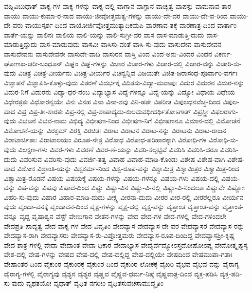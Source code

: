 ವಹ್ನಿವಿಬುಧಾತ್
ವಾಕ್ಯ-ಗಳ
ವಾಕ್ಯ-ಗಳನ್ನು
ವಾಕ್ಯ-ದಲ್ಲಿ
ವಾಗ್ತಾನ
ವಾಗ್ದಾನ
ವಾಚ್ಯತ್ವ
ವಾಪಸ್ಸು
ವಾಮನಾವ-ತಾರ
ವಾಯು
ವಾಯು-ಕುಮಾ-ರ-ನಾದ
ವಾಯು-ಜೀವೋತ್ತಮತ್ವ-ಗಳನ್ನು
ವಾಯು-ದೇ-ವರ
ವಾಯು-ದೇ-ವ-ರಿಂದ
ವಾಯು-ದೇ-ವರು
ವಾಯುಸ್ಪರ್ಶ-ದಿಂದ
ವಾಯೋರ್ಜಿವೋತ್ತಮುತ್ಯಾದಿಕಮಪಿ
ವಾರಣಾವ-ತಕ್ಕೆ
ವಾರಣಾತ್ರ-ದಿಂದ
ವಾರ್ತಾಂ
ವಾರ್ತೆ-ಯನ್ನು
ವಾಲಿನಃ
ವಾಲಿಯ
ವಾಲಿ-ಯನ್ನು
ವಾಲಿ-ಸುಗ್ರೀ-ವರ
ವಾಸ
ವಾಸ-ಮಾಡುತ್ತಿ-ದುದು
ವಾಸ-ಮಾಡುತ್ತಿದ್ದುದು
ವಾಸ-ಮಾಡುವುದು
ವಾಸವೀ
ವಾಸಿಸು-ವಂತೆ
ವಾಸಿ-ಸು-ವುದು
ವಾಸುದೇವ
ವಾಸುದೇವನ
ವಾಸುದೇವನು
ವಾಸುದೇವನೇ
ವಾಸುದೇ-ವಾದಿ
ವಾಸುರನ
ವಾಸ್ತಿ
ವಿಂದ
ವಿಂದ-ಅನು-ವಿಂದರ
ವಿಂದನ
ವಿಕರ್ಣ-ಘೋಣಖ-ಚರೀ-ಬಂಧೂನ್
ವಿಘ್ನಂ
ವಿಘ್ನ-ಗಳನ್ನು
ವಿಚಾರ
ವಿಚಾರ-ಗಳು
ವಿಚಾರ-ದಲ್ಲಿ
ವಿಚಾರ-ವನ್ನು
ವಿಚಾರಿ-ಸು-ವುದು
ವಿಚಿತ್ರ
ವಿಚಿತ್ರ-ವೀರ್ಯನು
ವಿಚಿತ್ರ-ವೀರ್ಯರ
ವಿಚಿನ್ವನ್ನಿವ
ವಿಜಯತೇ
ವಿಜಿತ-ಜರಾಸಂಧ-ಪೂರ್ವಾರಿ-ವರ್ಗಃ
ವಿಜ್ಞಾಪನೆ
ವಿಜ್ಞಾಪಿಸಿ-ಕೊಳ್ಳು-ವುದು
ವಿತರಣೆ
ವಿದರ್ಭಕ್ಕೆ
ವಿದಿತಸು-ವಿದ್ಯಾ-ಮವಾಪುಃ
ವಿದುರ
ವಿದುರನ
ವಿದುರ-ನನ್ನು
ವಿದುರ-ನಿಗೆ
ವಿದುರನು
ವಿದ್ಯಾ-ಧರ-ನೆಂಬ
ವಿದ್ಯಾಭ್ಯಾಸ
ವಿದ್ಯೆ-ಗಳನ್ನೂ
ವಿದ್ಯೆ-ಯನ್ನು
ವಿದ್ಯೋ
ವಿಧಾಯ
ವಿಧೇಯ
ವಿಧೇರತ್ರತಃ
ವಿಧೋರನ್ವಯೇ
ವಿನಃ
ವಿನಹ
ವಿನಾ
ವಿನಾ-ಶವು
ವಿನಿ-ಹತೇ
ವಿಪರೀತ
ವಿಪುಲಧನವೆಚ್ಚ-ದಿಂದ
ವಿಪುಲ-ವಾದ
ವಿಪ್ರ
ವಿಪ್ರ-ತೀ-ಸಾರತಃ
ವಿಪ್ರ-ನಲ್ಲಿ
ವಿಪ್ರ-ಶಾಪಾದ್ಯದು-ಕುಲಮವಧೀದರ್ಥಿತೋಽಗಾತ್
ವಿಪ್ರಸ್ತ್ರೀ
ವಿಫಲರಾಗು-ವುದು
ವಿಭಜನೆ
ವಿಭವ-ನಾಮ
ವಿಭಿದ್ಯ
ವಿಭೀಷಣ-ನಿಂದ
ವಿಭೀಷಣ-ನಿಗೆ
ವಿಭೀಷಣನೂ
ವಿಮಾನ-ದಲ್ಲಿ
ವಿಮೋಚನೆ
ವಿಮೋಚನೆ-ಯನ್ನು
ವಿರಕ್ತಮ್
ವಿರಕ್ತಿ
ವಿರಚಿತಃ
ವಿರಾಟ
ವಿರಾಟನ
ವಿರಾಟ-ನನ್ನು
ವಿರಾಟನು
ವಿರಾಟ-ರಾಜನ
ವಿರಾಟಾರ್ಚಿತಾಃ
ವಿರಾಟಾಲಯಂ
ವಿರೂಪ-ನೇತ್ರ
ವಿರೋಧ
ವಿರೋಧ-ಪರಿಹಾರಕ್ಕಾಗಿ
ವಿರೋಧಿ-ಗಳ
ವಿರೋಧಿ-ಸು-ವುದು
ವಿಲಕ್ಷಣ-ಗಳು
ವಿವರ-ಗಳು
ವಿವರಣೆ
ವಿವರ-ಣೆ-ಯನ್ನು
ವಿವರಿ-ಸಲ್ಪಟ್ಟಿವೆ
ವಿವರಿಸಿ
ವಿವರಿಸಿ-ದರೂ
ವಿವರಿಸಿ-ದುದು
ವಿವರಿಸುವ
ವಿವರಿಸು-ವುದು
ವಿವರ್ಜಿ-ತತ್ವ
ವಿವಾಹ
ವಿವಾಹ-ಮಾಡಿ-ಕೊಂಡು
ವಿಶೇಷ
ವಿಶೇಷ-ವಾಗಿ
ವಿಶೇಷ-ವಾದ
ವಿಶೋಕ
ವಿಶ್ರಾಂತಿ-ಯನ್ನು
ವಿಶ್ವಕರ್ಮ-ನಿಂದ
ವಿಶ್ವ-ರೂಪ-ವನ್ನು
ವಿಶ್ವಾಮಿತ್ರ
ವಿಶ್ವಾಮಿತ್ರರ
ವಿಶ್ವಾಮಿತ್ರ-ರಿಂದ
ವಿಶ್ವಾಮಿತ್ರ-ರೊಡನೆ
ವಿಷಯ
ವಿಷಯಕ್ಕೆ
ವಿಷಯ-ಗಳನ್ನು
ವಿಷಯ-ಗಳನ್ನೂ
ವಿಷಯ-ಗಳು
ವಿಷಯ-ದಲ್ಲಿ
ವಿಷಯ-ವನ್ನು
ವಿಷ-ವನ್ನು
ವಿಷವು
ವಿಷಾದ-ದಿಂದ
ವಿಷ್ಣು
ವಿಷ್ಣು-ವಿನ
ವಿಷ್ಣು-ವಿ-ನಲ್ಲಿ
ವಿಷ್ಣು-ವಿ-ನಿಂದಲೂ
ವಿಷ್ಣುವೇ
ವಿಷ್ಣೋಃ
ವಿಹರಿ-ಸು-ವುದು
ವಿಹಾರ
ವಿಹಾರ-ಮಾಡಿ-ದುದು
ವೀಕ್ಷ್ಯ
ವೀರನಾ-ದುದು
ವೀರರ
ವೀರ-ರಲ್ಲಿ
ವೀರರೆಲ್ಲರೂ
ವೀರ್ಯನ
ವುದು
ವೃಂದಾ-ವನಕ್ಕೆ
ವೃಂದಾವನ-ದಿಂದ
ವೃಕ್ಷ-ಗಳನ್ನು
ವೃಕ್ಷ-ದಲ್ಲಿ
ವೃಕ್ಷ-ವನ್ನು
ವೃತ್ತಾಂತ
ವೃತ್ತಾಂತ-ವನ್ನು
ವೃತ್ತಾಂತ-ವನ್ನೂ
ವೃದ್ದ
ವೃಷಾಶ್ವನ
ವೆಸ್ಟ್
ವೇಣುಗಾನ
ವೇತನ-ಗಳನ್ನು
ವೇದ
ವೇದ-ಗಳ
ವೇದ-ಗಳಲ್ಲಿ
ವೇದ-ಗಳಿಂದಲೇ
ವೇದಪ್ರತಿ-ಪಾದ್ಯತ್ವ
ವೇದ-ವಾಕ್ಯ-ಗಳ
ವೇದ-ವಿವೃತಿಂ
ವೇದವ್ಯಾಸ
ವೇದವ್ಯಾಸ-ದೇ-ವರ
ವೇದವ್ಯಾಸರ
ವೇದವ್ಯಾಸ-ರನ್ನು
ವೇದವ್ಯಾಸ-ರಾಗಿ
ವೇದವ್ಯಾಸರು
ವೇದವ್ಯಾಸ-ರು-ವಿಪ್ರೋತ್ತಮರು
ವೇದವ್ಯಾಸ-ರೂಪ-ದಿಂದಿದ್ದ
ವೇದವ್ಯಾಸಶ್ರೀ-ಕೃಷ್ಣ
ವೇದ-ಶಾತ್ರ-ಗಳಲ್ಲಿ
ವೇದಾ
ವೇದಾಂತ
ವೇದಾ-ಧಿಕಾರ
ವೇದಾಭ್ಯಾಸ
ವೇದೈರ್ವೆದ್ಯೋಽಸ್ತದೋಷೋಽಪ್ಯ
ವೇದೋತ್ಕೃಷ್ಟಸ್ಯ
ವೇಶ-ದಲ್ಲಿ
ವೇಷ-ಗಳನ್ನು
ವೇಷದ
ವೇಷ-ದಲ್ಲಿ
ವೇಷ-ದಲ್ಲಿದ್ದ
ವೇಷ-ದಲ್ಲಿಯೇ
ವೇಷದಿಂದ
ವೇಷಮುಪಾ-ಗತಾಃ
ವೇಷಾಂತರ-ದಿಂದ
ವೈಕುಂಠ
ವೈಕುಂಠಕ್ಕೆ
ವೈಕುಂಠ-ದಿಂದ
ವೈಕುಂಠ-ಲೋಕಕ್ಕೆ
ವೈಖರಿ
ವೈಭವ
ವೈಭವ-ವನ್ನು
ವೈರಾಗ್ಯ
ವೈರಾಗ್ಯ-ಗಳಲ್ಲಿ
ವೈರಾಗ್ಯವು
ವೈಶ್ಯನ
ವೈಶ್ಯರ
ವೈಷ್ಣವ
ವೈಷ್ಣವ-ಧರ್ಮ-ನಿಷ್ಠೆ
ವೈಷ್ಣವಾತ್ರ-ದಿಂದ
ವ್ಯಕ್ತ-ಪಡಿಸಿ
ವ್ಯಕ್ತ-ಪಡಿ-ಸು-ವುದು
ವ್ಯಥತಯೋ
ವ್ಯಧಾತ್‌
ವ್ಯಧಿತ-ನಗರೀಂ
ವ್ಯಧಿತಸುವಚಸಾಮುದ್ಧೃತಿಂ
